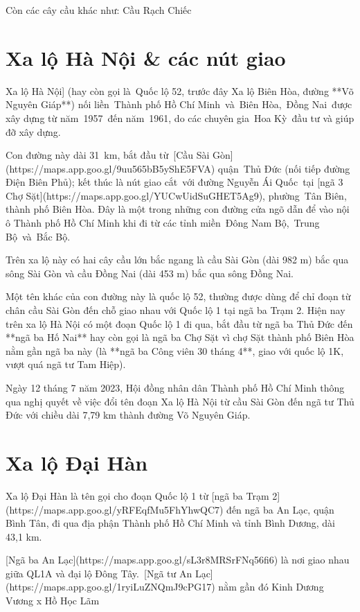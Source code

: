 Còn các cây cầu khác như: Cầu Rạch Chiếc

\section{Xa lộ Hà Nội \& các nút giao}

Xa lộ Hà Nội] (hay còn gọi là Quốc lộ 52, trước đây Xa lộ Biên Hòa, đường **Võ Nguyên Giáp**) nối liền Thành phố Hồ Chí Minh và Biên Hòa, Đồng Nai được xây dựng từ năm 1957 đến năm 1961, do các chuyên gia Hoa Kỳ đầu tư và giúp đỡ xây dựng.

Con đường này dài 31 km, bắt đầu từ [Cầu Sài Gòn](https://maps.app.goo.gl/9uu565bB5yShE5FVA) quận Thủ Đức (nối tiếp đường Điện Biên Phủ); kết thúc là nút giao cắt với đường Nguyễn Ái Quốc tại [ngã 3 Chợ Sặt](https://maps.app.goo.gl/YUCwUidSuGHET5Ag9), phường Tân Biên, thành phố Biên Hòa. Đây là một trong những con đường cửa ngõ dẫn để vào nội ô Thành phố Hồ Chí Minh khi đi từ các tỉnh miền Đông Nam Bộ, Trung Bộ và Bắc Bộ.

Trên xa lộ này có hai cây cầu lớn bắc ngang là cầu Sài Gòn (dài 982 m) bắc qua sông Sài Gòn và cầu Đồng Nai (dài 453 m) bắc qua sông Đồng Nai.

Một tên khác của con đường này là quốc lộ 52, thường được dùng để chỉ đoạn từ chân cầu Sài Gòn đến chỗ giao nhau với Quốc lộ 1 tại ngã ba Trạm 2. Hiện nay trên xa lộ Hà Nội có một đoạn Quốc lộ 1 đi qua, bắt đầu từ ngã ba Thủ Đức đến **ngã ba Hố Nai** hay còn gọi là ngã ba Chợ Sặt vì chợ Sặt thành phố Biên Hòa nằm gần ngã ba này (là **ngã ba Công viên 30 tháng 4**, giao với quốc lộ 1K, vượt quá ngã tư Tam Hiệp).

Ngày 12 tháng 7 năm 2023, Hội đồng nhân dân Thành phố Hồ Chí Minh thông qua nghị quyết về việc đổi tên đoạn Xa lộ Hà Nội từ cầu Sài Gòn đến ngã tư Thủ Đức với chiều dài 7,79 km thành đường Võ Nguyên Giáp.

\section{Xa lộ Đại Hàn}

Xa lộ Đại Hàn là tên gọi cho đoạn Quốc lộ 1 từ [ngã ba Trạm 2](https://maps.app.goo.gl/yRFEqfMu5FhYhwQC7) đến ngã ba An Lạc, quận Bình Tân, đi qua địa phận Thành phố Hồ Chí Minh và tỉnh Bình Dương, dài 43,1 km.

[Ngã ba An Lạc](https://maps.app.goo.gl/sL3r8MRSrFNq56fi6) là nơi giao nhau giữa QL1A và đại lộ Đông Tây.\
[Ngã tư An Lạc](https://maps.app.goo.gl/1ryiLuZNQmJ9cPG17) nằm gần đó Kinh Dương Vương x Hồ Học Lãm

